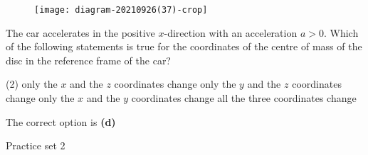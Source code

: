 \begin{enumerate}
\begin{minipage}{\textwidth}
	\begin{figure}[H]
		\centering
		\texttt{[image: diagram-20210926(37)-crop]}
	\end{figure}
	The car accelerates in the positive $x$-direction with an acceleration $a>0 .$ Which of the following statements is true for the coordinates of the centre of mass of the disc in the reference frame of the car?
\end{minipage}
\begin{tasks}(2)
	\task[\textbf{A.}] only the $x$ and the $z$ coordinates change
	\task[\textbf{B.}]only the $y$ and the $z$ coordinates change
	\task[\textbf{C.}]only the $x$ and the $y$ coordinates change
	\task[\textbf{D.}]all the three coordinates change
\end{tasks}
\begin{answer}
The correct option is \textbf{(d)}	
\end{answer}
\end{enumerate}
\newpage
\begin{abox}
	Practice set 2
	\end{abox}
